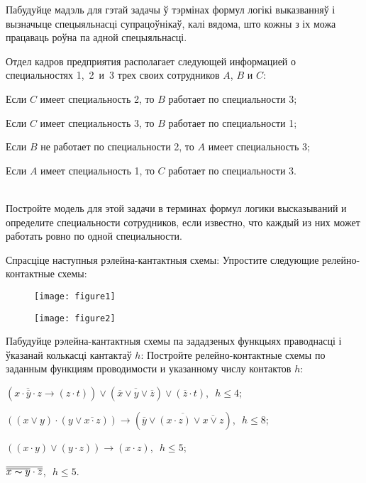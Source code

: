 \begin{problemList}
{Пабудуйце мадэль для гэтай задачы ў тэрмінах формул логікі выказванняў і вызначыце спецыяльнасці супрацоўнікаў, калі вядома, што кожны з іх можа працаваць роўна па адной спецыяльнасці.}
{Отдел кадров предприятия располагает следующей информацией о специальностях 1,~2~и~3 трех своих сотрудников $A$, $B$ и $C$:
\begin{russianEnumerate}
    \item Если $C$ имеет специальность 2, то $B$ работает по специальности 3;
    \item Если $C$ имеет специальность 3, то $B$ работает по специальности 1;
    \item Если $B$ не работает по специальности 2, то $A$ имеет специальность 3;
    \item Если $A$ имеет специальность 1, то $C$ работает по специальности 3.
\end{russianEnumerate}\\
Постройте модель для этой задачи в терминах формул логики высказываний и определите  специальности сотрудников, если известно, что каждый из них может работать ровно по  одной специальности.}

\bigskip

\problemItemWithCommonPart
{Спрасціце наступныя рэлейна-кантактныя схемы:}
{Упростите следующие релейно-контактные схемы:}
{%
\begin{figure}[H]
    \begin{center}
        \texttt{[image: figure1]}
    \end{center}
\end{figure}

\begin{figure}[H]
    \begin{center}
        \texttt{[image: figure2]}
    \end{center}
\end{figure}
}

\problemItemWithCommonPart
{Пабудуйце рэлейна-кантактныя схемы па зададзеных функцыях праводнасці і ўказанай колькасці кантактаў $h$:}
{Постройте релейно-контактные схемы по заданным функциям проводимости и указанному числу контактов $h$:}
{%
\begin{belarusianEnumerate}
    \item $(\overline{x \cdot \overline{y} \cdot z} \to (z \cdot t)) \vee
    (\overline{\overline{x} \vee y \vee \overline{z}}) \vee (\overline{z} \cdot t)$,\,\, $h \le 4$;
    \item $((x \vee y) \cdot (y \vee \overline{x \cdot z})) \to (\overline{\overline{y} \vee
    (x \cdot z) \vee \overline{x \vee z}})$,\,\, $h \le 8$;
    \item $((x \cdot y) \vee (y \cdot z)) \to (x \cdot z)$,\,\, $h \le 5$;
    \item $\overline{\overline{x \thicksim y} \cdot \overline{z}}$,\,\, $h \le 5$.
\end{belarusianEnumerate}
}


\end{problemList}
